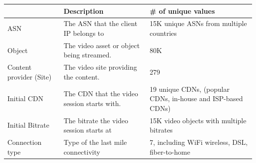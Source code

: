 \begin{table}[h!]
\begin{center}
\begin{small}
\begin{tabular}{p{1.7cm}|p{2.8cm}|p{2.8cm}}
    ~                          & Description                                                       & \# of unique values                                                          \\ \hline
    ASN                        & The ASN that the client IP belongs to  & 15K unique ASNs from multiple countries                                  \\ \hline
    Object                     &  The video asset or object being streamed.                  & 80K                                                                           \\ \hline
    Content provider (Site)    & The video site providing the content.                             & 279                                                                          \\ \hline
    Initial CDN                &  	The CDN that the video session starts with.                & 19 unique CDNs, (popular CDNs, in-house and ISP-based CDNs) \\ \hline
     Initial Bitrate     &  		The bitrate the video session starts at          & 15K video objects with multiple bitrates                          \\ \hline
     Connection type     &  	Type of the last mile connectivity                         & 7, including WiFi wireless, DSL, fiber-to-home                                    \\
\end{tabular}
\end{small}
\end{center}
\label{tab:attributes}
\end{table}


